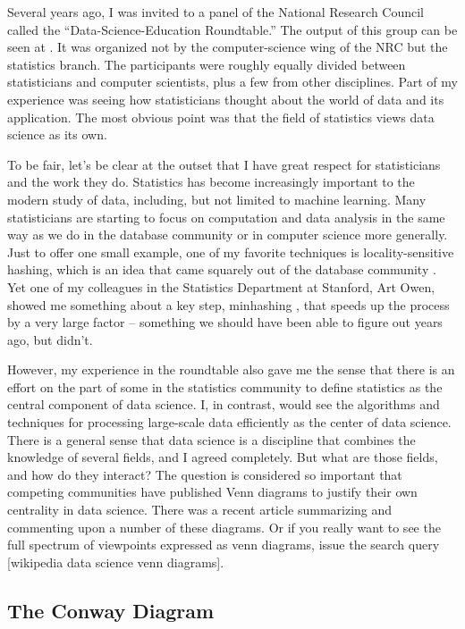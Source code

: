 \documentclass[11pt]{article}
\begin{document}
Several years ago, I was invited to a panel of the National Research Council called the ``Data-Science-Education Roundtable.''  The output of this group can be seen at \cite{dsr}.  It was organized not by the computer-science wing of the NRC but the statistics branch.  The participants were roughly equally divided between  statisticians and computer scientists, plus a few from other disciplines.  Part of my experience was seeing how statisticians thought about the world of data and its application.  The most obvious point was that the field of statistics views data science as its own.

To be fair, let's be clear at the outset that I have great respect for statisticians and the work they do.
Statistics has become increasingly important to the modern study of data, including, but not limited to machine learning.
Many statisticians are starting to focus on computation and data analysis in the same way as we do in the database community or in
computer science more generally.  Just to offer one small example, one of my favorite techniques is locality-sensitive hashing, which is an
idea that came squarely out of the database community \cite{lsh}.   Yet one of my colleagues in the Statistics Department at Stanford, Art Owen,
showed me something \cite{owen} about a key step, minhashing \cite{minhash}, that speeds up the process by a very large factor -- something we should have been able to figure out years ago, but didn't.

However, my experience in the roundtable also gave me the sense that there is an effort on the part of some in the statistics community to define statistics as the central component of data science.  I, in contrast, would see the algorithms and techniques for processing large-scale data efficiently as the center of data science.  There is a general sense that data science is a discipline that combines the knowledge of several fields, and I agreed completely.  But what are those fields, and how do they interact?  The question is considered so important that competing communities have published Venn diagrams to justify their own centrality in data science.  There was a recent article \cite{venn} summarizing and commenting upon  a number of these diagrams.  Or if you really want to see the full spectrum of viewpoints expressed as venn diagrams, issue the search query [wikipedia data science venn diagrams].

\subsection{The Conway Diagram}
\end{document}
